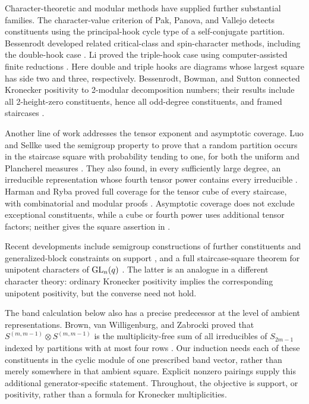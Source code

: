 Character-theoretic and modular methods have supplied further substantial
families. The character-value criterion of Pak, Panova, and Vallejo
\cite{pakpanovavallejo2016} detects constituents using the principal-hook
cycle type of a self-conjugate partition. Bessenrodt developed related
critical-class and spin-character methods, including the double-hook
case \cite{bessenrodt2018}. Li proved the triple-hook case using
computer-assisted finite reductions \cite{li2021}.
Here double and triple hooks are diagrams whose largest square has side
two and three, respectively.
Bessenrodt, Bowman, and Sutton connected Kronecker positivity to
2-modular decomposition numbers; their results include all
2-height-zero constituents, hence all odd-degree constituents, and
framed staircases \cite[Theorems~5.2 and~5.5]{bessenrodtbowmansutton2021}.

Another line of work addresses the tensor exponent and asymptotic
coverage. Luo and Sellke used the semigroup property to prove that a
random partition occurs in the staircase square with probability tending
to one, for both the uniform and Plancherel measures
\cite[Theorems~1.5 and~1.6]{luosellke2017}. They also found, in every
sufficiently large degree, an irreducible representation whose fourth
tensor power contains every irreducible
\cite[Theorem~1.4]{luosellke2017}. Harman and Ryba proved full coverage
for the tensor cube of every staircase, with combinatorial and modular
proofs \cite[Theorem~1.1]{harmanryba2023}.
Asymptotic coverage does not exclude exceptional constituents, while a
cube or fourth power uses additional tensor factors; neither gives the square
assertion in .

Recent developments include semigroup constructions of further
constituents and generalized-block constraints on support
\cite{ebrahimi2025}, and a full
staircase-square theorem for unipotent characters of $\operatorname{GL}_n(q)$
\cite[Theorem~1.1]{letelliernam2025}. The latter is an analogue in a
different character theory: ordinary Kronecker positivity implies the
corresponding unipotent positivity, but the converse need not hold.

The band calculation below also has a precise predecessor at the level
of ambient representations. Brown, van Willigenburg, and Zabrocki proved
that
$S^{(m,m-1)}\otimes S^{(m,m-1)}$ is the multiplicity-free sum of all
irreducibles of $S_{2m-1}$ indexed by partitions with at most four rows
\cite[Corollary~4.1]{brownwilligenburgzabrocki2010}.
Our induction needs each of these constituents in the cyclic module of
one prescribed band vector, rather than merely somewhere in that
ambient square. Explicit nonzero pairings supply this additional
generator-specific statement. Throughout, the objective is support,
or positivity, rather than a formula for Kronecker multiplicities.

